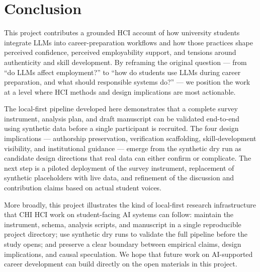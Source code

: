 \documentclass[sigconf]{acmart}
\begin{document}
\section{Conclusion}
This project contributes a grounded HCI account of how university students integrate LLMs into career-preparation workflows and how those practices shape perceived confidence, perceived employability support, and tensions around authenticity and skill development. By reframing the original question --- from ``do LLMs affect employment?'' to ``how do students use LLMs during career preparation, and what should responsible systems do?'' --- we position the work at a level where HCI methods and design implications are most actionable.

The local-first pipeline developed here demonstrates that a complete survey instrument, analysis plan, and draft manuscript can be validated end-to-end using synthetic data before a single participant is recruited. The four design implications --- authorship preservation, verification scaffolding, skill-development visibility, and institutional guidance --- emerge from the synthetic dry run as candidate design directions that real data can either confirm or complicate. The next step is a piloted deployment of the survey instrument, replacement of synthetic placeholders with live data, and refinement of the discussion and contribution claims based on actual student voices.

More broadly, this project illustrates the kind of local-first research infrastructure that CHI HCI work on student-facing AI systems can follow: maintain the instrument, schema, analysis scripts, and manuscript in a single reproducible project directory; use synthetic dry runs to validate the full pipeline before the study opens; and preserve a clear boundary between empirical claims, design implications, and causal speculation. We hope that future work on AI-supported career development can build directly on the open materials in this project.



\end{document}
